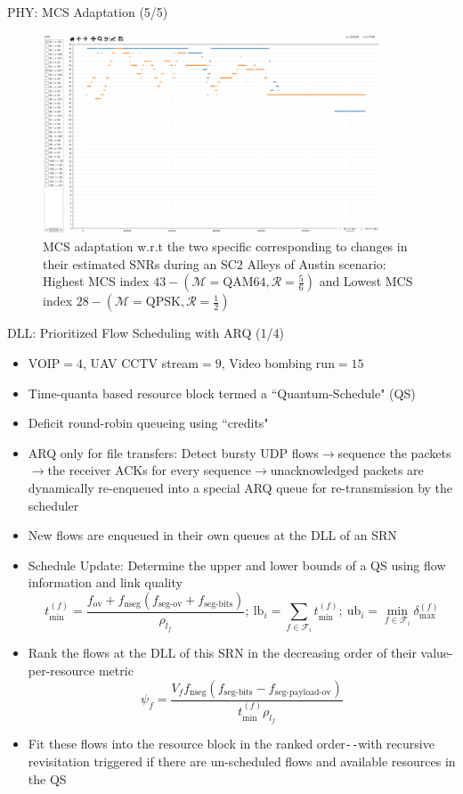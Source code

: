 \documentclass{beamer}
\begin{document}
\begin{frame}{PHY: MCS Adaptation (5/5)}
\begin{figure}
    \centering
    \includegraphics[width = 0.90\textwidth]{Alleys_MCS_1.PNG}
    \caption{MCS adaptation w.r.t the two specific corresponding to changes in their estimated SNRs during an SC$2$ Alleys of Austin scenario: Highest MCS index $43{-}(\mathcal{M}{=}\text{QAM}64,\mathcal{R}{=}\frac{5}{6})$ and Lowest MCS index $28{-}(\mathcal{M}{=}\text{QPSK},\mathcal{R}{=}\frac{1}{2})$}
    \label{fig:10}
\end{figure}
\end{frame}
\begin{frame}{DLL: Prioritized Flow Scheduling with ARQ (1/4)}
    \footnotesize{\begin{itemize}
        \item VOIP${=}4$, UAV CCTV stream${=}9$, Video bombing run${=}15$ 
        \item Time-quanta based resource block termed a ``Quantum-Schedule" (QS)
        \item Deficit round-robin queueing using ``credits"
        \item ARQ only for file transfers: Detect bursty UDP flows$\longrightarrow$sequence the packets$\longrightarrow$the receiver ACKs for every sequence$\longrightarrow$unacknowledged packets are dynamically re-enqueued into a special ARQ queue for re-transmission by the scheduler
        \item New flows are enqueued in their own queues at the DLL of an SRN
        \item Schedule Update: Determine the upper and lower bounds of a QS using flow information and link quality
        \[t_{\text{min}}^{(f)}=\frac{f_{\text{ov}}+f_{\text{nseg}}(f_{\text{seg-ov}}+f_{\text{seg-bits}})}{\rho_{l_{f}}};\ \text{lb}_{i}=\sum_{f \in \mathcal{F}_{i}}t_{\text{min}}^{(f)};\ \text{ub}_{i}=\min_{f \in \mathcal{F}_{i}}\delta_{\text{max}}^{(f)}\]
        \item Rank the flows at the DLL of this SRN in the decreasing order of their value-per-resource metric
        \[\psi_{f}=\frac{V_{f}f_{\text{nseg}}(f_{\text{seg-bits}}-f_{\text{seg-payload-ov}})}{t_{\text{min}}^{(f)}\rho_{l_{f}}}\]
        \item Fit these flows into the resource block in the ranked order\texttt{-{}-}with recursive revisitation triggered if there are un-scheduled flows and available resources in the QS
    \end{itemize}}
\end{frame}
\end{document}
